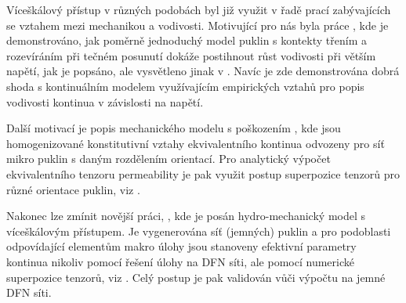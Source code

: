 \documentclass{article}
\begin{document}
Víceškálový přístup v různých podobách byl již využit v řadě prací zabývajících se vztahem mezi mechanikou a vodivosti. 
Motivující pro nás byla práce \cite{Min2004a}, kde je demonstrováno, jak poměrně jednoduchý model puklin s 
kontekty třením a rozevíráním při tečném posunutí
dokáže postihnout růst vodivosti při větším napětí, jak je popsáno, ale vysvětleno jinak v \cite{Souley2001}.
Navíc je zde demonstrována dobrá shoda s kontinuálním modelem využívajícím empirických vztahů pro popis vodivosti kontinua v závislosti na napětí.

Další motivací je popis mechanického modelu s poškozením \cite{Shao2005}, kde jsou homogenizované konstitutivní vztahy ekvivalentního kontinua
odvozeny pro síť mikro puklin s daným rozdělením orientací. Pro analytický výpočet ekvivalentního tenzoru permeability je pak využit postup superpozice tenzorů 
pro různé orientace puklin, viz \cite{Oda1986a}.

Nakonec lze zmínit novější práci, \cite{Rutqvist2013}, kde je posán hydro-mechanický model s víceškálovým přístupem. Je vygenerována síť (jemných) 
puklin a pro podoblasti odpovídající elementům makro úlohy jsou stanoveny efektivní parametry kontinua nikoliv pomocí řešení  úlohy na DFN síti, 
ale pomocí numerické superpozice tenzorů, viz \cite{Oda1986a}. Celý postup je pak validován vůči výpočtu na jemné DFN síti.



% 
% 
\end{document}
